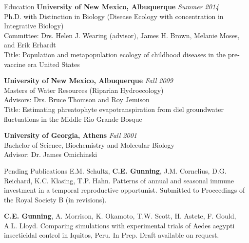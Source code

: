 \documentclass{resume} %
\begin{document}

\begin{rSection}{Education}
{\bf University of New Mexico, Albuquerque} \hfill {\em Summer 2014} \\ 
Ph.D. with Distinction in Biology (Disease Ecology with concentration in
Integrative Biology) \\
Committee: Drs. Helen J. Wearing (advisor), James H. Brown, Melanie Moses, and Erik Erhardt\\
Title: Population and metapopulation ecology of childhood diseases in the pre-vaccine era United States

{\bf University of New Mexico, Albuquerque} \hfill {\em Fall 2009} \\ 
Masters of Water Resources (Riparian Hydroecology) \\
Advisors: Drs. Bruce Thomson and Roy Jemison \\
Title: Estimating phreatophyte evapotranspiration from diel groundwater fluctuations in the Middle Rio Grande Bosque

{\bf University of Georgia, Athens} \hfill {\em Fall 2001} \\ 
Bachelor of Science, Biochemistry and Molecular Biology \\
Advisor: Dr. James Omichinski
\end{rSection}


\begin{rSection}{Pending Publications}
E.M. Schultz, {\bf C.E. Gunning}, J.M. Cornelius, D.G. Reichard, K.C. Klasing, 
T.P. Hahn. Patterns of annual and seasonal immune investment in a temporal reproductive
opportunist. Submitted to Proceedings of the Royal Society B (in revisions).

{\bf C.E. Gunning}, A. Morrison, K. Okamoto, T.W. Scott, H. Astete, F. Gould,
A.L. Lloyd. Comparing simulations with experimental trials of Aedes aegypti insecticidal
control in Iquitos, Peru. In Prep. Draft available on request.


\end{rSection}
\end{document}

